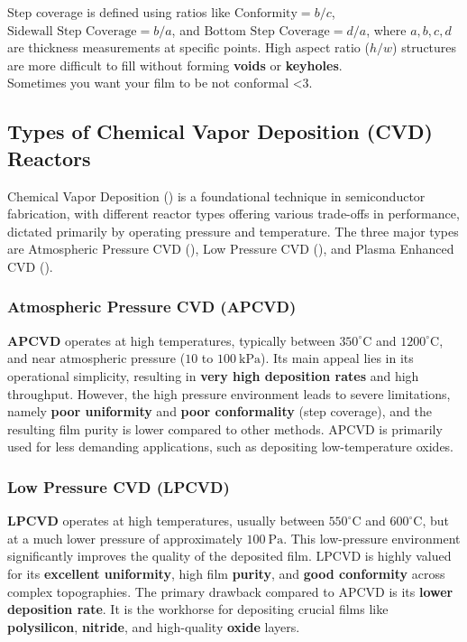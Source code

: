 \documentclass{report}
\begin{document}
Step coverage is defined using ratios like $\text{Conformity} = b/c$, $\text{Sidewall Step Coverage} = b/a$, and $\text{Bottom Step Coverage} = d/a$, where $a, b, c, d$ are thickness measurements at specific points. High aspect ratio ($h/w$) structures are more difficult to fill without forming \textbf{voids} or \textbf{keyholes}.\\ Sometimes you want your film to be not conformal <3.

\subsection{Types of Chemical Vapor Deposition (CVD) Reactors}

Chemical Vapor Deposition () is a foundational technique in semiconductor fabrication, with different reactor types offering various trade-offs in performance, dictated primarily by operating pressure and temperature. The three major types are Atmospheric Pressure CVD (), Low Pressure CVD (), and Plasma Enhanced CVD ().

\subsubsection{Atmospheric Pressure CVD (APCVD)}

\textbf{APCVD} operates at high temperatures, typically between $350^\circ\text{C}$ and $1200^\circ\text{C}$, and near atmospheric pressure ($10$ to $100~\text{kPa}$). Its main appeal lies in its operational simplicity, resulting in \textbf{very high deposition rates} and high throughput. However, the high pressure environment leads to severe limitations, namely \textbf{poor uniformity} and \textbf{poor conformality} (step coverage), and the resulting film purity is lower compared to other methods. $\text{APCVD}$ is primarily used for less demanding applications, such as depositing low-temperature oxides.

\subsubsection{Low Pressure CVD (LPCVD)}
\textbf{LPCVD} operates at high temperatures, usually between $550^\circ\text{C}$ and $600^\circ\text{C}$, but at a much lower pressure of approximately $100~\text{Pa}$. This low-pressure environment significantly improves the quality of the deposited film. $\text{LPCVD}$ is highly valued for its \textbf{excellent uniformity}, high film \textbf{purity}, and \textbf{good conformity} across complex topographies. The primary drawback compared to $\text{APCVD}$ is its \textbf{lower deposition rate}. It is the workhorse for depositing crucial films like \textbf{polysilicon}, \textbf{nitride}, and high-quality \textbf{oxide} layers.
\end{document}
